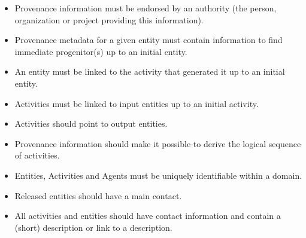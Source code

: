 \begin{itemize}


\item Provenance information must be endorsed by an authority (the person, organization or project providing this information).

\item Provenance metadata for a given entity must contain information to find immediate progenitor(s) up to an initial entity.

\item An entity must be linked to the activity that generated it up to an initial entity.

\item Activities must be linked to input entities up to an initial activity.

\item Activities should point to output entities.

\item Provenance information should make it possible to derive the logical sequence of activities.


\item Entities, Activities and Agents must be uniquely identifiable within a domain.

\item Released entities should have a main contact.

\item All activities and entities should have contact information and contain a (short) description or link to a description.

\end{itemize}

